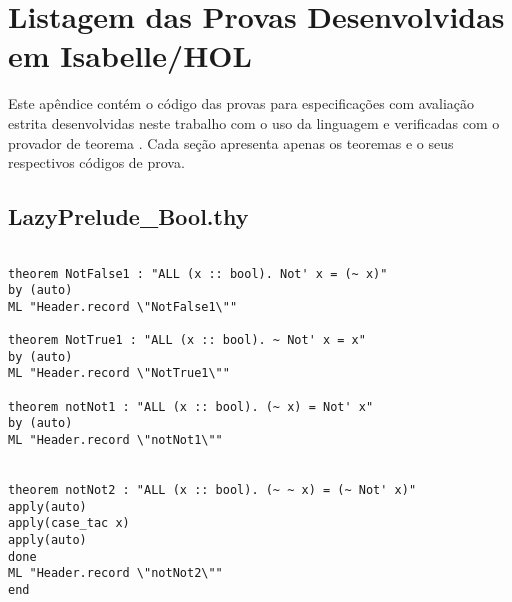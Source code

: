 \chapter{Listagem das Provas Desenvolvidas em Isabelle/HOL}
\label{appendix:lazyProofs}
Este apêndice contém o código das provas para especificações com avaliação estrita desenvolvidas neste trabalho com o uso da linguagem \HOL e verificadas com o provador de teorema \Isabelle.
Cada seção apresenta apenas os teoremas e o seus respectivos códigos de prova.

\section{LazyPrelude\_Bool.thy}
\label{appendix:lazyProofs:Bool}
\begin{multicols}{2}
\tiny
\begin{Verbatim}

theorem NotFalse1 : "ALL (x :: bool). Not' x = (~ x)"
by (auto)
ML "Header.record \"NotFalse1\""

theorem NotTrue1 : "ALL (x :: bool). ~ Not' x = x"
by (auto)
ML "Header.record \"NotTrue1\""

theorem notNot1 : "ALL (x :: bool). (~ x) = Not' x"
by (auto)
ML "Header.record \"notNot1\""


theorem notNot2 : "ALL (x :: bool). (~ ~ x) = (~ Not' x)"
apply(auto)
apply(case_tac x)
apply(auto)
done
ML "Header.record \"notNot2\""
end
\end{Verbatim}
\end{multicols}

